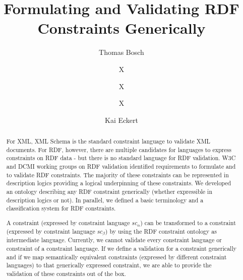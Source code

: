 \documentclass{llncs}
\newcommand{\ms}[1]{\texttt{#1}}
\begin{document}
%
%
\title{Formulating and Validating RDF Constraints Generically}
%
%
\author{Thomas Bosch \and X \and X \and X \and Kai Eckert}
%
%

\maketitle              %

\begin{abstract}

For XML, XML Schema is the standard constraint language to validate XML documents.
For RDF, however, there are multiple candidates for languages to express constraints on RDF data - but there is no standard language for RDF validation.
W3C and DCMI working groups on RDF validation identified requirements to formulate and to validate RDF constraints.
The majority of these constraints can be represented in description logics providing a logical underpinning of these constraints.
We developed an ontology describing any RDF constraint generically (whether expressible in description logics or not).
In parallel, we defined a basic terminology and a classification system for RDF constraints.

A constraint (expressed by constraint language \ms{$sc_{\alpha}$}) can be transformed to a constraint (expressed by constraint language \ms{$sc_{\beta}$}) by using the RDF constraint ontology as intermediate language. 
Currently, we cannot validate every constraint language or constraint of a constraint language.
If we define a validation for a constraint generically and if we map semantically equivalent constraints (expressed by different constraint languages) to that generically expressed constraint, we are able to provide the validation of these constraints out of the box.

\end{abstract}
%
\end{document}
